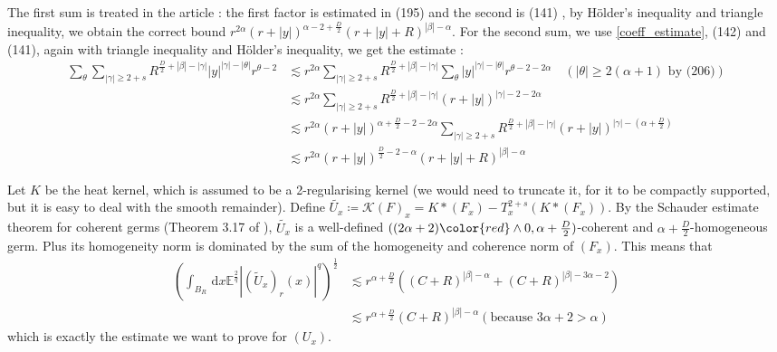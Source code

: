 \documentclass[12pt, a4paper]{article}
\newcommand{\abs}[1]{\left| #1 \right|}
\newcommand{\dd}{\,\mathrm{d}}
\begin{document}
The first sum is treated in the article : the first factor is estimated in (195) \cite{BOT25} and the second is (141) \cite{BOT25}, by Hölder's inequality and triangle inequality, we obtain the correct bound $r^{2\alpha}(r+\abs{y})^{\alpha - 2 + \frac{D}{2}}(r+\abs{y}+R)^{\abs{\beta}-\alpha}$.
For the second sum, we use \eqref{coeff_estimate}, (142) and (141), again with triangle inequality and Hölder's inequality, we get the estimate :
\begin{align*}
    \sum_{\theta}\sum_{\abs{\gamma}\geq 2+s} R^{\frac{D}{2}+\abs{\beta}-\abs{\gamma}} \abs{y}^{\abs{\gamma} - \abs{\theta}}r^{\theta -2} &\lesssim r^{2\alpha} \sum_{\abs{\gamma}\geq 2+s} R^{\frac{D}{2}+\abs{\beta}-\abs{\gamma}} \sum_{\theta} \abs{y}^{\abs{\gamma} - \abs{\theta}}r^{\theta -2 - 2\alpha} \quad (\abs{\theta}\geq 2(\alpha+1) \text{ by (206)})\\
    &\lesssim r^{2\alpha} \sum_{\abs{\gamma}\geq 2+s} R^{\frac{D}{2}+\abs{\beta}-\abs{\gamma}}  (r+\abs{y})^{\abs{\gamma} -2 -2\alpha}\\
    &\lesssim r^{2\alpha} (r+\abs{y})^{\alpha + \frac{D}{2} -2 -2\alpha} \sum_{\abs{\gamma}\geq 2+s} R^{\frac{D}{2}+\abs{\beta}-\abs{\gamma}} (r+\abs{y})^{\abs{\gamma} -(\alpha + \frac{D}{2})}\\
    &\lesssim r^{2\alpha} (r+\abs{y})^{\frac{D}{2} -2 -\alpha} (r+\abs{y}+R)^{\abs{\beta}-\alpha}
\end{align*}


Let $K$ be the heat kernel, which is assumed to be a 2-regularising kernel (we would need to truncate it, for it to be compactly supported, but it is easy to deal with the smooth remainder).
Define $\tilde{U_x}\coloneq \mathcal{K}(F)_x = K*(F_x) - T_x^{2+s}(K*(F_x))$.
By the Schauder estimate theorem for coherent germs (Theorem 3.17 of \cite{BCZ24}), $\tilde{U_x}$ is a well-defined $((2\alpha + 2){\color{red}\wedge 0}, \alpha +\frac{D}{2})$-coherent and $\alpha + \frac{D}{2}$-homogeneous germ.
Plus its homogeneity norm is dominated by the sum of the homogeneity and coherence norm of $(F_x)$.
This means that 
\begin{align}
        \left(\int_{B_R} \dd x \mathbb{E}^{\frac{2}{q}}\abs{(\tilde{U}_x)_r(x)}^q \right)^\frac{1}{2} &\lesssim r^{\alpha + \frac{D}{2}}((C+R)^{\abs{\beta} - \alpha}+(C+R)^{\abs{\beta} - 3\alpha-2})\\
&\lesssim r^{\alpha + \frac{D}{2}}(C+R)^{\abs{\beta} - \alpha} (\text{because }3\alpha+2>\alpha)
\end{align}
which is exactly the estimate we want to prove for $(U_x)$.
\end{document}
